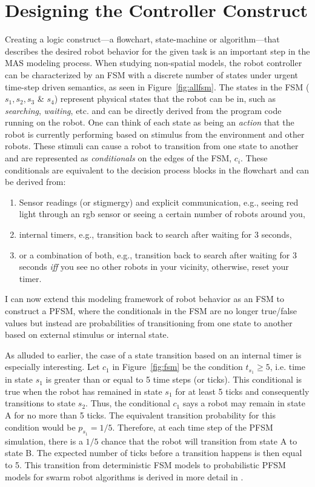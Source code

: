 \documentclass[12pt]{book}
\begin{document}
\section{Designing the Controller Construct}
Creating a logic construct---a flowchart, state-machine or algorithm---that describes the desired robot behavior for the given task is an important step in the MAS modeling process. When studying non-spatial models, the robot controller can be characterized by an FSM with a discrete number of states under urgent time-step driven semantics, as seen in Figure~\ref{fig:allfsm}. The states in the FSM ($s_1, s_2, s_3$ \& $s_4$) represent physical states that the robot can be in, such as  \emph{searching}, \emph{waiting}, etc. and can be directly derived from the program code running on the robot. One can think of each state as being an \emph{action} that the robot is currently performing based on stimulus from the environment and other robots. These stimuli can cause a robot to transition from one state to another and are represented as \emph{conditionals} on the edges of the FSM, $c_i$. These conditionals are equivalent to the decision process blocks in the flowchart and can be derived from:
\begin{enumerate}
\item Sensor readings (or stigmergy) and explicit communication, e.g., seeing red light through an rgb sensor or seeing a certain number of robots around you,
\item internal timers, e.g., transition back to search after waiting for 3 seconds,
\item or a combination of both, e.g., transition back to search after waiting for 3 seconds \emph{iff} you see no other robots in your vicinity, otherwise, reset your timer.
\end{enumerate}

I can now extend this modeling framework of robot behavior as an FSM to construct a PFSM, where the conditionals in the FSM are no longer true/false values but instead are probabilities of transitioning from one state to another based on external stimulus or internal state. 

As alluded to earlier, the case of a state transition based on an internal timer is especially interesting. Let $c_1$ in Figure~\ref{fig:fsm} be the condition $t_{s_1} \geq 5$, i.e. time in state $s_1$ is greater than or equal to 5 time steps (or ticks). This conditional is true when the robot has remained in state $s_1$ for at least 5 ticks and consequently transitions to state $s_2$. Thus, the conditional $c_1$ says a robot may remain in state A for no more than 5 ticks. The equivalent transition probability for this condition would be $p_{s_1} = 1/5$. Therefore, at each time step of the PFSM simulation, there is a $1/5$ chance that the robot will transition from state A to state B. The expected number of ticks before a transition happens is then equal to 5. This transition from deterministic FSM models to probabilistic PFSM models for swarm robot algorithms is derived in more detail in \cite{Correll2007}.
\end{document}
